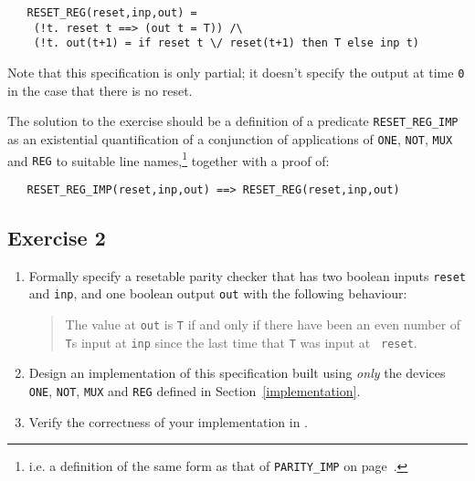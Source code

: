 {\small\begin{verbatim}
   RESET_REG(reset,inp,out) =
    (!t. reset t ==> (out t = T)) /\
    (!t. out(t+1) = if reset t \/ reset(t+1) then T else inp t)
\end{verbatim}}

\noindent Note that this specification is only partial; it doesn't specify the
output at time {\small\verb|0|} in the case that there is no reset.

The solution to the exercise should be a definition of a predicate
{\small\verb|RESET_REG_IMP|} as an existential quantification of a
conjunction of applications of {\small\verb|ONE|}, {\small\verb|NOT|},
{\small\verb|MUX|} and {\small\verb|REG|} to suitable line
names,\footnote{i.e.  a definition of the same form as that of
  {\small\tt PARITY\_IMP}
on page~\pageref{parity-imp}.
} together with a proof of:

{\small\begin{verbatim}
   RESET_REG_IMP(reset,inp,out) ==> RESET_REG(reset,inp,out)
\end{verbatim}}


\subsection{Exercise 2}

\begin{enumerate}
\item Formally specify a resetable parity checker that has two boolean
  inputs {\small\tt reset} and {\small\tt inp}, and one boolean output
  {\small\tt out} with the following behaviour:
  \begin{quote}
    The value at {\small\tt out} is {\small\tt T} if and only if there
    have been an even number of {\small\tt T}s input at {\small\tt inp}
    since the last time that {\small\tt T} was input at {\small\tt
      reset}.
  \end{quote}
\item Design an implementation of this specification built using {\it
    only\/} the devices {\small\verb|ONE|}, {\small\verb|NOT|},
  {\small\verb|MUX|} and {\small\verb|REG|} defined in
  Section~\ref{implementation}.
\item Verify the correctness of your implementation in \HOL.
\end{enumerate}

